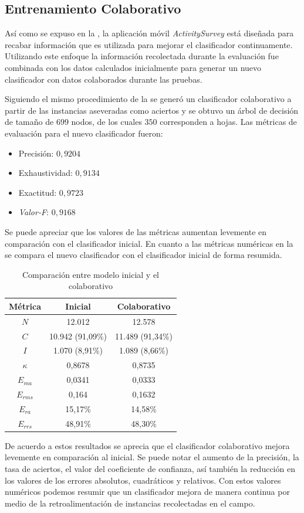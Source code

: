 \subsection{Entrenamiento Colaborativo}

Así como se expuso en la , la aplicación móvil
\emph{ActivitySurvey} está diseñada para recabar información que es
utilizada para mejorar el clasificador continuamente. Utilizando este
enfoque la información recolectada durante la evaluación fue combinada
con los datos calculados inicialmente para generar un nuevo clasificador
con datos colaborados durante las pruebas.

Siguiendo el mismo procedimiento de la 
se generó un clasificador colaborativo a partir de las instancias
aseveradas como aciertos y se obtuvo un árbol de decisión de tamaño
de $699$ nodos, de los cuales $350$ corresponden a hojas. Las métricas
de evaluación para el nuevo clasificador fueron:
\begin{itemize}
\item Precisión: $0,9204$
\item Exhaustividad: $0,9134$
\item Exactitud: $0,9723$
\item \emph{Valor-F}: $0,9168$
\end{itemize}
Se puede apreciar que los valores de las métricas aumentan levemente
en comparación con el clasificador inicial. En cuanto a las métricas
numéricas en la  se compara el nuevo
clasificador con el clasificador inicial de forma resumida.

\begin{table}[H]
\begin{centering}
\begin{tabular}{|c|c|c|}
\hline 
Métrica & Inicial & Colaborativo\tabularnewline
\hline 
\hline 
$N$ & 12.012 & 12.578\tabularnewline
\hline 
$C$ & 10.942 (91,09\%) & 11.489 (91,34\%)\tabularnewline
\hline 
$I$ & 1.070 (8,91\%) & 1.089 (8,66\%)\tabularnewline
\hline 
$\kappa$ & 0,8678 & 0,8735\tabularnewline
\hline 
$E_{ma}$ & 0,0341 & 0,0333\tabularnewline
\hline 
$E_{rms}$ & 0,164 & 0,1632\tabularnewline
\hline 
$E_{ra}$ & 15,17\% & 14,58\%\tabularnewline
\hline 
$E_{rrs}$ & 48,91\% & 48,30\%\tabularnewline
\hline 
\end{tabular}
\par\end{centering}
\caption{\label{tab6:comparacion-clasi}Comparación entre modelo inicial y
el colaborativo}
\end{table}

De acuerdo a estos resultados se aprecia que el clasificador colaborativo
mejora levemente en comparación al inicial. Se puede notar el aumento
de la precisión, la tasa de aciertos, el valor del coeficiente de
confianza, así también la reducción en los valores de los errores
absolutos, cuadráticos y relativos. Con estos valores numéricos podemos
resumir que un clasificador mejora de manera continua por medio de
la retroalimentación de instancias recolectadas en el campo.
